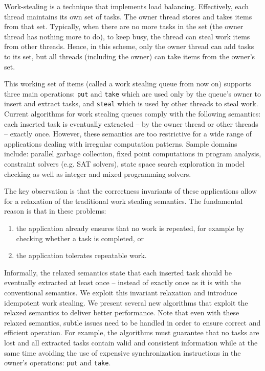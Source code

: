 Work-stealing is a technique that implements load balancing.
Effectively, each thread maintains its own set of tasks. The owner
thread stores and takes items from that set. Typically, when there are
no more tasks in the set (the owner thread has nothing more to do), to
keep busy, the thread can steal work items from other threads. Hence,
in this scheme, only the owner thread can add tasks to its set, but
all threads (including the owner) can take items from the owner's set.

This working set of items (called a work stealing queue from now on)
supports three main operations: \lstinline!put! and \lstinline!take!
which are used only by the queue's owner to insert and extract tasks,
and \lstinline!steal! which is used by other threads to steal work.
Current algorithms for work stealing queues comply with the following
semantics: each inserted task is eventually extracted -- by the owner
thread or other threads -- exactly once. However, these semantics are
too restrictive for a wide range of applications dealing with
irregular computation patterns. Sample domains include: parallel
garbage collection, fixed point computations in program analysis,
constraint solvers (e.g. SAT solvers), state space search exploration
in model checking as well as integer and mixed programming solvers.

The key observation is that the correctness invariants of these
applications allow for a relaxation of the traditional work stealing
semantics. The fundamental reason is that in these problems:

\begin{enumerate}
\item the application already ensures that no work is repeated, for
  example by checking whether a task is completed, or
\item the application tolerates repeatable work.
\end{enumerate}

Informally, the relaxed semantics state that each inserted task should
be eventually extracted at least once -- instead of exactly once as it
is with the conventional semantics. We exploit this invariant
relaxation and introduce idempotent work stealing. We present several
new algorithms that exploit the relaxed semantics to deliver better
performance. Note that even with these relaxed semantics, subtle
issues need to be handled in order to ensure correct and efficient
operation. For example, the algorithms must guarantee that no tasks
are lost and all extracted tasks contain valid and consistent
information while at the same time avoiding the use of expensive
synchronization instructions in the owner's operations:
\lstinline!put! and \lstinline!take!.

